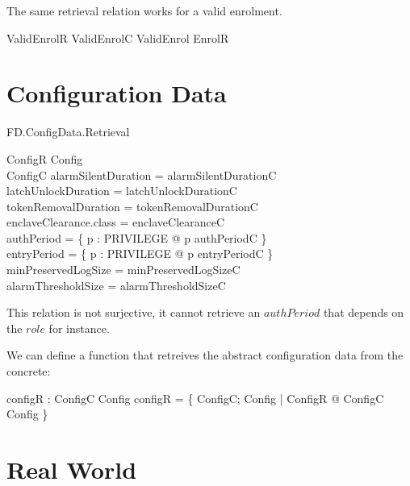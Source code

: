 The same retrieval relation works for a valid enrolment.
\begin{zed}
        ValidEnrolR  ValidEnrolC \land ValidEnrol \land EnrolR
\end{zed}


\section{Configuration Data}

\begin{traceunit}{FD.ConfigData.Retrieval}
\end{traceunit}



\begin{schema}{ConfigR}
        Config
\\      ConfigC
\where
        alarmSilentDuration = alarmSilentDurationC
\\      latchUnlockDuration = latchUnlockDurationC
\\      tokenRemovalDuration = tokenRemovalDurationC
\\      enclaveClearance.class = enclaveClearanceC
\\      authPeriod = \{ p : PRIVILEGE @ p \mapsto authPeriodC \}
\\      entryPeriod = \{ p : PRIVILEGE @ p \mapsto entryPeriodC \}
\\      minPreservedLogSize = minPreservedLogSizeC
\\      alarmThresholdSize = alarmThresholdSizeC
\end{schema}

This relation is not surjective, it cannot retrieve an $authPeriod$ that
depends on the $role$ for instance. 

We can define a function that retreives the abstract configuration
data from the concrete:

\begin{axdef}
        configR : ConfigC \fun Config
\where
        configR = \{ ConfigC; Config | ConfigR @ \theta ConfigC \mapsto
        \theta Config \}
\end{axdef}

\section{Real World}

